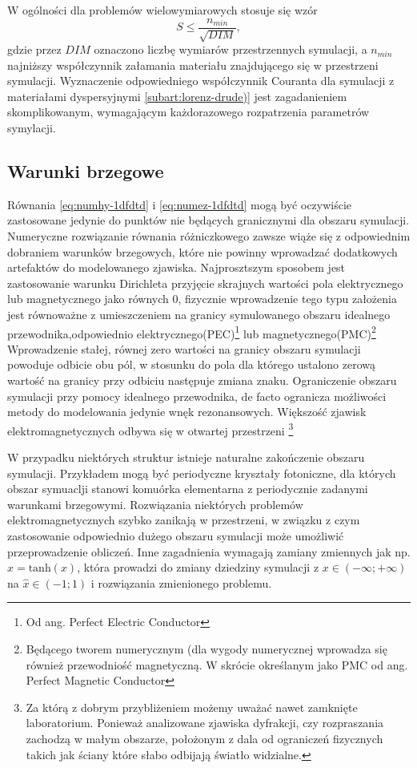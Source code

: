 W ogólności dla problemów wielowymiarowych stosuje się wzór
\begin{equation}
S\le\frac{n_{min}}{\sqrt{DIM}},
\label{eq:courant}
\end{equation}
gdzie przez $DIM$ oznaczono liczbę wymiarów przestrzennych symulacji, a $n_{min}$ najniższy współczynnik załamania materiału znajdującego się w przestrzeni symulacji. Wyznaczenie odpowiedniego współczynnik Couranta dla symulacji z materiałami dyspersyjnymi \ref{subart:lorenz-drude)} jest zagadanieniem skomplikowanym, wymagającym każdorazowego rozpatrzenia parametrów symylacji.

\subsection{Warunki brzegowe}
Równania \ref{eq:numhy-1dfdtd} i \ref{eq:numez-1dfdtd} mogą być oczywiście zastosowane jedynie do punktów nie będących granicznymi dla obszaru symulacji. Numeryczne rozwiązanie równania różniczkowego zawsze wiąże się z odpowiednim dobraniem warunków brzegowych, które nie powinny wprowadzać dodatkowych artefaktów do modelowanego zjawiska. Najprosztszym sposobem jest zastosowanie warunku Dirichleta przyjęcie skrajnych wartości pola elektrycznego lub magnetycznego jako równych 0, fizycznie wprowadzenie tego typu założenia jest równoważne z umieszczeniem na granicy symulowanego obszaru idealnego przewodnika,odpowiednio elektrycznego(PEC)\footnote{Od ang. Perfect Electric Conductor} lub magnetycznego(PMC)\footnote{Będącego tworem numerycznym (dla wygody numerycznej wprowadza się również przewodniość magnetyczną. W skrócie określanym jako PMC od ang. Perfect Magnetic Conductor} Wprowadzenie stałej, równej zero wartości na granicy obszaru symulacji powoduje odbicie obu pól, w stosunku do pola dla którego ustalono zerową wartość na granicy przy odbiciu następuje zmiana znaku. Ograniczenie obszaru symulacji przy pomocy idealnego przewodnika, de facto ogranicza możliwości metody do modelowania jedynie wnęk rezonansowych. Większość zjawisk elektromagnetycznych odbywa się w otwartej przestrzeni \footnote{Za którą z dobrym przybliżeniem możemy uważać nawet zamknięte laboratorium. Ponieważ analizowane zjawiska dyfrakcji, czy rozpraszania zachodzą w małym obszarze, położonym z dala od ograniczeń fizycznych takich jak ściany które słabo odbijają światło widzialne.}

W przypadku niektórych struktur istnieje naturalne zakończenie obszaru symulacji. Przykładem mogą być periodyczne kryształy fotoniczne, dla których obszar symuaclji stanowi komuórka elementarna z periodycznie zadanymi warunkami brzegowymi. Rozwiązania niektórych problemów elektromagnetycznych szybko zanikają w przestrzeni, w związku z czym zastosowanie odpowiednio dużego obszaru symulacji może umożliwić przeprowadzenie obliczeń. Inne zagadnienia wymagają zamiany zmiennych  jak np. $\hat{x}=\textrm{tanh}(x)$, która prowadzi do zmiany dziedziny symulacji z $x\in(- \infty; + \infty)$ na $\hat{x}\in(-1;1)$ i rozwiązania zmienionego problemu. 

